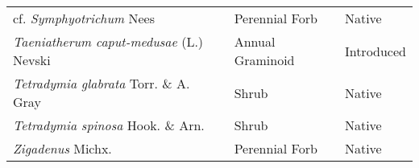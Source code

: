 \documentclass[8pt,]{article}
\begin{document}
\begin{longtable}[]{@{}lll@{}}
\begin{minipage}[t]{0.49\columnwidth}
cf. \emph{Symphyotrichum} Nees\strut
\end{minipage} & \begin{minipage}[t]{0.27\columnwidth}\raggedright\strut
Perennial Forb\strut
\end{minipage} & \begin{minipage}[t]{0.15\columnwidth}\raggedright\strut
Native\strut
\end{minipage}\tabularnewline
\begin{minipage}[t]{0.49\columnwidth}\raggedright\strut
\emph{Taeniatherum caput-medusae} (L.) Nevski\strut
\end{minipage} & \begin{minipage}[t]{0.27\columnwidth}\raggedright\strut
Annual Graminoid\strut
\end{minipage} & \begin{minipage}[t]{0.15\columnwidth}\raggedright\strut
Introduced\strut
\end{minipage}\tabularnewline
\begin{minipage}[t]{0.49\columnwidth}\raggedright\strut
\emph{Tetradymia glabrata} Torr. \& A. Gray\strut
\end{minipage} & \begin{minipage}[t]{0.27\columnwidth}\raggedright\strut
Shrub\strut
\end{minipage} & \begin{minipage}[t]{0.15\columnwidth}\raggedright\strut
Native\strut
\end{minipage}\tabularnewline
\begin{minipage}[t]{0.49\columnwidth}\raggedright\strut
\emph{Tetradymia spinosa} Hook. \& Arn.\strut
\end{minipage} & \begin{minipage}[t]{0.27\columnwidth}\raggedright\strut
Shrub\strut
\end{minipage} & \begin{minipage}[t]{0.15\columnwidth}\raggedright\strut
Native\strut
\end{minipage}\tabularnewline
\begin{minipage}[t]{0.49\columnwidth}\raggedright\strut
\emph{Zigadenus} Michx.\strut
\end{minipage} & \begin{minipage}[t]{0.27\columnwidth}\raggedright\strut
Perennial Forb\strut
\end{minipage} & \begin{minipage}[t]{0.15\columnwidth}\raggedright\strut
Native\strut
\end{minipage}\tabularnewline
\bottomrule
\end{longtable}
\end{document}
